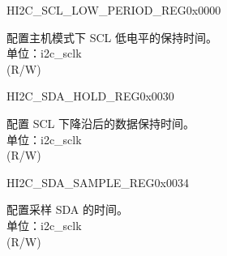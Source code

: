 \begin{register}{H}{I2C\_SCL\_LOW\_PERIOD\_REG}{0x0000}\label{regdesc:I2CSCLLOWPERIODREG}
%
%
\regnewline%
\begin{regdesc}\begin{reglist}
\label{fielddesc:I2CSCLLOWPERIOD}\item [I2C\_SCL\_LOW\_PERIOD] 配置主机模式下 SCL 低电平的保持时间。\\
单位：i2c\_sclk \\ (R/W)
\end{reglist}\end{regdesc}
\end{register}


\begin{register}{H}{I2C\_SDA\_HOLD\_REG}{0x0030}\label{regdesc:I2CSDAHOLDREG}
%
%
\regnewline%
\begin{regdesc}\begin{reglist}
\label{fielddesc:I2CSDAHOLDTIME}\item [I2C\_SDA\_HOLD\_TIME] 配置 SCL 下降沿后的数据保持时间。\\
单位：i2c\_sclk \\ (R/W)
\end{reglist}\end{regdesc}
\end{register}


\begin{register}{H}{I2C\_SDA\_SAMPLE\_REG}{0x0034}\label{regdesc:I2CSDASAMPLEREG}
%
%
\regnewline%
\begin{regdesc}\begin{reglist}
\label{fielddesc:I2CSDASAMPLETIME}\item [I2C\_SDA\_SAMPLE\_TIME] 配置采样 SDA 的时间。\\
单位：i2c\_sclk \\ (R/W)
\end{reglist}\end{regdesc}
\end{register}


